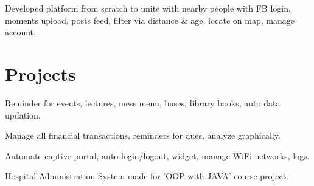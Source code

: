 \documentclass[a4paper]{deedy-resume} %
\begin{document}
\begin{minipage}[t]{0.66\textwidth}
Developed platform from scratch to unite with nearby people with FB login, moments upload, posts feed, filter via distance \& age, locate on map, manage account.

\sectionspace %


\section{Projects}


Reminder for events, lectures, mess menu, buses, library books, auto data updation.

\sectionspace %


Manage all financial transactions, reminders for dues, analyze graphically.

\sectionspace %


Automate captive portal, auto login/logout, widget, manage WiFi networks, logs.

\sectionspace %


Hospital Administration System made for ’OOP with JAVA’ course project.

\sectionspace %


\end{minipage}
\end{document}
